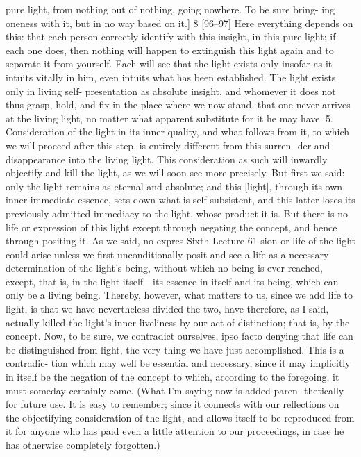 pure light, from nothing out of nothing, going nowhere. To be sure bring-
ing oneness with it, but in no way based on it.] 8
[96–97] Here everything depends on this: that each person correctly
identify with this insight, in this pure light; if each one does, then nothing
will happen to extinguish this light again and to separate it from yourself.
Each will see that the light exists only insofar as it intuits vitally in him,
even intuits what has been established. The light exists only in living self-
presentation as absolute insight, and whomever it does not thus grasp,
hold, and fix in the place where we now stand, that one never arrives at the
living light, no matter what apparent substitute for it he may have.
5. Consideration of the light in its inner quality, and what follows from it, to
which we will proceed after this step, is entirely different from this surren-
der and disappearance into the living light. This consideration as such will
inwardly objectify and kill the light, as we will soon see more precisely. But
first we said: only the light remains as eternal and absolute; and this [light],
through its own inner immediate essence, sets down what is self-subsistent,
and this latter loses its previously admitted immediacy to the light, whose
product it is. But there is no life or expression of this light except through
negating the concept, and hence through positing it. As we said, no expres-Sixth Lecture
61
sion or life of the light could arise unless we first unconditionally posit and
see a life as a necessary determination of the light’s being, without which
no being is ever reached, except, that is, in the light itself—its essence in
itself and its being, which can only be a living being. Thereby, however,
what matters to us, since we add life to light, is that we have nevertheless
divided the two, have therefore, as I said, actually killed the light’s inner
liveliness by our act of distinction; that is, by the concept. Now, to be sure,
we contradict ourselves, ipso facto denying that life can be distinguished
from light, the very thing we have just accomplished. This is a contradic-
tion which may well be essential and necessary, since it may implicitly in
itself be the negation of the concept to which, according to the foregoing,
it must someday certainly come. (What I’m saying now is added paren-
thetically for future use. It is easy to remember; since it connects with our
reflections on the objectifying consideration of the light, and allows itself
to be reproduced from it for anyone who has paid even a little attention to
our proceedings, in case he has otherwise completely forgotten.)
